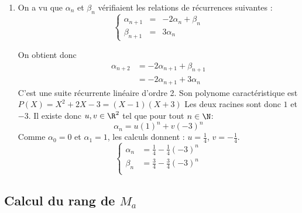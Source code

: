 \begin{correction}
\begin{enumerate}
\item On a vu que $\alpha_n$ et $\beta_n$ vérifiaient les relations de récurrences suivantes : 
$$\left\{ \begin{array}{rcl}
\alpha_{n+1} &=& -2\alpha_n +\beta_n\\
\beta_{n+1} &=& 3\alpha_n
\end{array}\right.$$

On obtient donc 
\begin{align*}
\alpha_{n+2} &= -2\alpha_{n+1} + \beta_{n+1}  \\
					&= -2\alpha_{n+1} +3\alpha_n
\end{align*}
C'est une suite récurrente linéaire d'ordre 2. Son polynome caractéristique est $P(X)=X^2 +2X -3=(X-1)(X+3)$ Les deux racines sont donc $1 $ et $-3$. Il existe donc $u,v\in \R^2$ tel que pour tout $n\in \N$:
$$\alpha_n = u (1)^n +v (-3)^n$$
Comme $\alpha_0 =0 $ et $\alpha_1 =1 $, les calculs donnent : 
$u = \frac{1}{4}$, $v=-\frac{1}{4}$. 
$$\left\{ 
\begin{array}{cc}
\alpha_n &= \frac{1}{4}  - \frac{1}{4} (-3)^n \\
\beta_n &= \frac{3}{4}  - \frac{3}{4} (-3)^n \\
\end{array}\right.
$$





\end{enumerate}
\end{correction}



\subsection{Calcul du rang de $M_a$}

